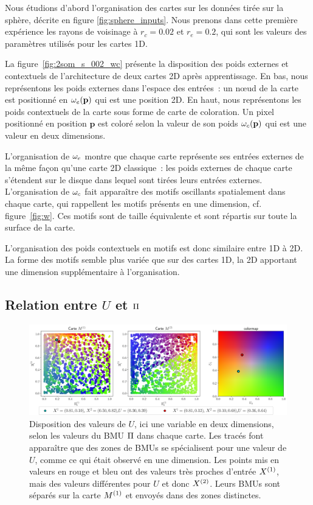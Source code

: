 \documentclass[../main]{subfiles}
\begin{document}
Nous étudions d'abord l'organisation des cartes sur les données tirée sur la sphère, décrite en figure \ref{fig:sphere_inputs}. 
Nous prenons dans cette première expérience les rayons de voisinage à $r_c = 0.02$ et $r_e = 0.2$, qui sont les valeurs des paramètres utilisés pour les cartes 1D.

La figure~\ref{fig:2som_s_002_wc} présente la disposition des poids externes et contextuels de l'architecture de deux cartes 2D après apprentissage.
En bas, nous représentons les poids externes dans l'espace des entrées~: un n\oe{}ud de la carte est positionné en $\omega_e(\mathbf{p})$ qui est une position 2D.
En haut, nous représentons les poids contextuels de la carte sous forme de carte de coloration. Un pixel positionné en position $\mathbf{p}$ est coloré selon la valeur de son poids $\omega_c(\mathbf{p})$ qui est une valeur en deux dimensions.

L'organisation de $\omega_e$ montre que chaque carte représente ses entrées externes de la même façon qu'une carte 2D classique~: les poids externes de chaque carte s'étendent sur le disque dans lequel sont tirées leurs entrées externes. 
L'organisation de $\omega_c$ fait apparaître des motifs oscillants spatialement dans chaque carte, qui rappellent les motifs présents en une dimension, cf. figure~\ref{fig:w}.
Ces motifs sont de taille équivalente et sont répartis sur toute la surface de la carte. 

L'organisation des poids contextuels en motifs est donc similaire entre 1D à 2D. La forme des motifs semble plus variée que sur des cartes 1D, la 2D apportant une dimension supplémentaire à l'organisation.

\subsection{Relation entre $U$ et $\Pi$ \label{par:U_bmu2D}}

\begin{figure}[t]
	\includegraphics[width=\textwidth]{U_BMU_2SOM_2D.png}
	\caption{Disposition des valeurs de $U$, ici une variable en deux dimensions, selon les valeurs du BMU $\Pi$ dans chaque carte. Les tracés font apparaître que des zones de BMUs se spécialisent pour une valeur de $U$, comme ce qui était observé en une dimension. Les points mis en valeurs en rouge et bleu ont des valeurs très proches d'entrée $X^{({1})}$, mais des valeurs différentes pour $U$ et donc $X^{({2})}$. Leurs BMUs sont séparés sur la carte $M^{({1})}$ et envoyés dans des zones distinctes.
	\label{fig:U_BMU}}
\end{figure}
\end{document}
